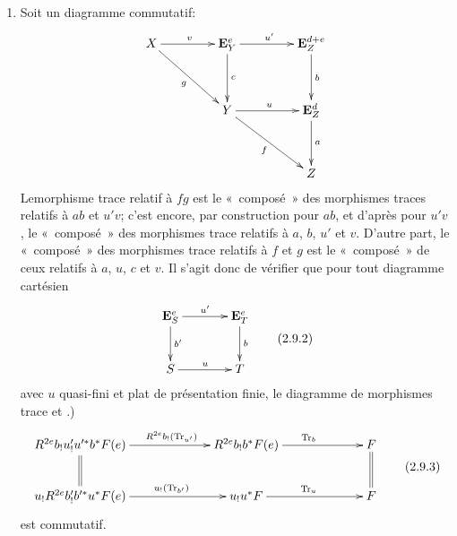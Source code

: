 \documentclass[10pt]{../fichiers-configuration-latex/smfart}
\begin{document}
\begin{enumerate}
Le lecteur qui voudrait polir les raisonnements qui suivent vérifiera
au préalable le

\begin{enonce*}{Lemme 2.9.1}
Soient $(f,g,h)$ trois morphismes $T$-compactifiables composables,
vérifiant $(\ast)_{k}$, $(\ast)_{\ell}$ et $(\ast)_{m}$.
$$
X\xrightarrow{h}Y\xrightarrow{g}Z\xrightarrow{f}T{\quoi}.
$$
Si les couples $(f,g)$ et $(g,h)$ vérifient {\rm (Var 3)}, alors pour
que $(f,gh)$ vérifie {\rm (Var 3)}, il faut et il suffit que $(fg,h)$
vérifie {\rm (Var 3)}.
\end{enonce*}

La condition envisagée dans la conclusion signifie encore que
$\Tr_{fgh}$ est « composé »  de $\Tr_{f}$, $\Tr_{g}$ et $\Tr_{h}$.

\item Soit un diagramme commutatif:
$$
\xymatrix@R=1.25cm@C=1.5cm{
X \ar[r]^{v} \ar[rd]_{g}& \EE^{e}_Y \ar[r]^{u'}\ar[d]^{c} & \EE_Z^{d+e}\ar[d]^{b} \\
            &     Y   \ar[r]^{u} \ar[rd]_{f}                       & \EE_Z^{d}\ar[d]^{a}  \\
            &                                  &     Z 
}
$$
Le\pageoriginale morphisme trace relatif à $fg$ est le
« composé » des morphismes traces relatifs à $ab$ et $u'v$; c'est encore, par
construction pour $ab$, et d'après  pour $u'v$, le « composé »  des morphismes trace relatifs à $a$, $b$, $u'$ et
$v$. D'autre part, le « composé »  des morphismes trace relatifs à
$f$ et $g$ est le « composé »  de ceux relatifs à $a$, $u$, $c$ et
$v$. Il s'agit donc de vérifier que pour tout diagramme cartésien
\begin{equation*}
\vcenter{
\xymatrix@C=1.25cm@R=1cm{
\EE^{e}_S  \ar[d]^{b'} \ar[r]^{u'}   & \EE^{e}_T \ar[d]^{b}\\
    S      \ar[r]^{u}     &      T
}}\tag{2.9.2}
\end{equation*}%
avec $u$ quasi-fini et plat de présentation finie, le diagramme de
morphismes trace  et .)
\begin{equation*}
\vcenter{
\xymatrix@C=2.25cm{
R^{2e}b_!u'_! u'^{\ast}b {}^{\ast} F(e) \ar[r]^(.55){R^{2e}b_!
  (\Tr_{u'})}\ar@{=}[d]& R^{2e}b_! b^{\ast} F(e)\ar[r]^{\Tr_b}
&  F \ar@{=}[d]\\
u_! R^{2e}b'_! b'^{\ast} u^{\ast} F(e)\ar[r]^(.55){u_!(\Tr_{b'})} & u_!
u^{\ast} F \ar[r]^{\Tr_u}& F
}}\tag{2.9.3}
\end{equation*}%
est commutatif.
\end{enumerate}
\end{document}
